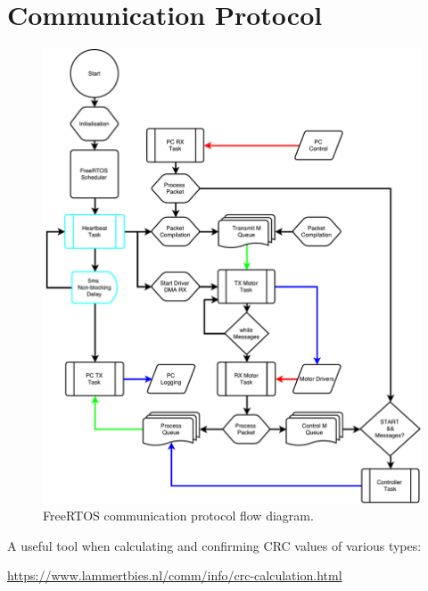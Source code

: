 \chapter{Communication Protocol}

\begin{figure}
\centering
\includegraphics[width=1\textwidth]{images/comms/communication-flow-diagram.pdf} 
\caption{FreeRTOS communication protocol flow diagram.}
\label{fig:FreeRTOS communication protocol flow diagram.}
\end{figure}

A useful tool when calculating and confirming CRC values of various types: 

\url{https://www.lammertbies.nl/comm/info/crc-calculation.html}

